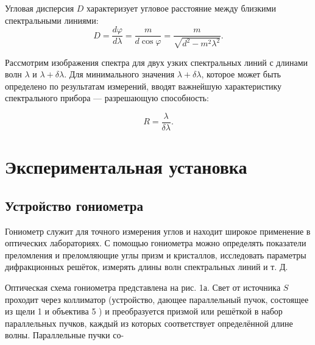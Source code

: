 \documentclass[a4paper,12pt]{article} %
\begin{document}
Угловая дисперсия $D$ характеризует угловое расстояние между близкими спектральными линиями:
	\begin{equation}
	D = \frac{d\varphi}{d\lambda} = \frac{m}{d \cos \varphi}=\frac{m}{\sqrt{d^{2}-m^{2} \lambda^{2}}}.
	\end{equation}

Рассмотрим изображения спектра для двух узких спектральных линий с длинами волн $\lambda$ и $\lambda+\delta\lambda$. Для минимального значения $\lambda+\delta\lambda$, которое может быть определено по результатам измерений, вводят важнейшую характеристику спектрального прибора — разрешающую способность:

\begin{equation}
    R=\frac{\lambda}{\delta\lambda}.
\end{equation}


\section{Экспериментальная установка}

\subsection{Устройство гониометра}

Гониометр служит для точного измерения углов и находит широкое применение в оптических лабораториях. С помощью гониометра можно определять показатели преломления и преломляющие углы призм и кристаллов, исследовать параметры дифракционных решёток, измерять длины волн спектральных линий и т. Д.

Оптическая схема гониометра представлена на рис. 1а. Свет от источника $S$ проходит через коллиматор (устройство, дающее параллельный пучок, состоящее из щели 1 и объектива 5 ) и преобразуется призмой или решёткой в набор параллельных пучков, каждый из которых соответствует определённой длине волны. Параллельные пучки со-
\end{document}
